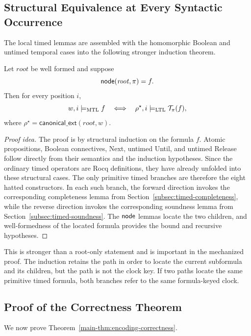 \subsection{Structural Equivalence at Every Syntactic Occurrence}

The local timed lemmas are assembled with the homomorphic Boolean and untimed temporal
cases into the following stronger induction theorem.

\begin{theorem}
\label{thm:canonical-all}
Let $\mathit{root}$ be well formed and suppose
\[
  \mathsf{node}(\mathit{root},\pi)=f.
\]
Then for every position $i$,
\[
  w,i\models_{\mathrm{MTL}} f
  \quad\Longleftrightarrow\quad
  \rho^\star,i\models_{\mathrm{LTL}}\mathcal{T}_\pi(f),
\]
where $\rho^\star=\mathsf{canonical\_ext}(\mathit{root},w)$.
\end{theorem}

\begin{proof}[Proof idea]
The proof is by structural induction on the formula $f$.  Atomic propositions,
Boolean connectives, Next, untimed Until, and untimed Release follow directly
from their semantics and the induction hypotheses.  Since the ordinary timed
operators are Rocq definitions, they have already unfolded into these structural
cases.  The only primitive timed branches are therefore the eight hatted
constructors.  In each such branch, the forward direction invokes the
corresponding completeness lemma from
Section~\ref{subsec:timed-completeness}, while the reverse direction invokes
the corresponding soundness lemma from
Section~\ref{subsec:timed-soundness}.  The $\mathsf{node}$ lemmas locate the two
children, and well-formedness of the located formula provides the bound and
recursive hypotheses.
\end{proof}

This is stronger than a root-only statement and is important in the mechanized
proof.  The induction retains the path in order to locate the current subformula
and its children, but the path is not the clock key.  If two paths locate the
same primitive timed formula, both branches refer to the same formula-keyed
clock.

\subsection{Proof of the Correctness Theorem}
\label{subsec:proof-main-theorem}
We now prove Theorem~\ref{main-thm:encoding-correctness}.

